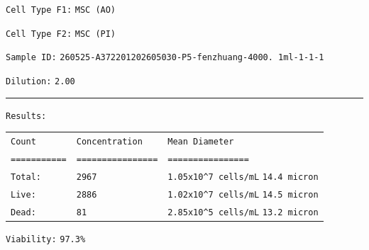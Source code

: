 \documentclass[UTF8,10pt,a4paper,fontset=fandol]{ctexart}
\newcommand{\fieldvalue}[1]{#1}
\begin{document}
\noindent\texttt{Cell Type F1:}
\fieldvalue{\texttt{MSC (AO)}}

\noindent\texttt{Cell Type F2:}
\fieldvalue{\texttt{MSC (PI)}}

\medskip

\noindent\texttt{Sample ID:}
\fieldvalue{\texttt{260525-A372201202605030-P5-fenzhuang-4000. 1ml-1-1-1}}

\noindent\texttt{Dilution:}
\fieldvalue{\texttt{2.00}}

\medskip
\hrule
\medskip

\noindent\texttt{Results:}

\begin{tabularx}{\textwidth}{@{}l>{\RaggedRight\arraybackslash}X>{\RaggedRight\arraybackslash}X@{}}
\texttt{Count} & \texttt{Concentration} & \texttt{Mean Diameter} \\
\texttt{===========} & \texttt{================} & \texttt{================} \\

\texttt{Total:}
&
\fieldvalue{\texttt{2967}}
&
\fieldvalue{\texttt{1.05x10\textasciicircum 7 cells/mL}}
\quad
\fieldvalue{\texttt{14.4 micron}}
\\

\texttt{Live:}
&
\fieldvalue{\texttt{2886}}
&
\fieldvalue{\texttt{1.02x10\textasciicircum 7 cells/mL}}
\quad
\fieldvalue{\texttt{14.5 micron}}
\\

\texttt{Dead:}
&
\fieldvalue{\texttt{81}}
&
\fieldvalue{\texttt{2.85x10\textasciicircum 5 cells/mL}}
\quad
\fieldvalue{\texttt{13.2 micron}}
\end{tabularx}

\medskip

\noindent\texttt{Viability:}
\fieldvalue{\texttt{97.3\%}}
\end{document}
